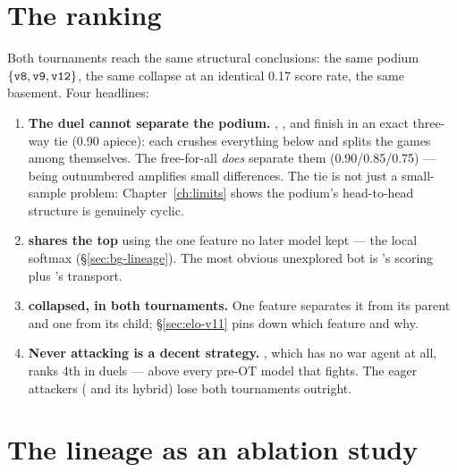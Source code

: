 \section{The ranking}
\label{sec:elo-ladder}

\begin{table}[htbp]
\centering
{}
\caption{The ladder under the duel protocol, with the free-for-all ranking
alongside (the two agree: Spearman $\rho = \ffaduelspearman$).}
\label{tab:elo}
\end{table}

Both tournaments reach the same structural conclusions: the same podium
$\{\texttt{v8}, \texttt{v9}, \texttt{v12}\}$, the same  collapse at an
identical 0.17 score rate, the same basement. Four headlines:

\begin{enumerate}
  \item \textbf{The duel cannot separate the podium.} , ,
    and  finish in an exact three-way tie (0.90 apiece): each
    crushes everything below and splits the games among themselves. The
    free-for-all \emph{does} separate them (0.90/0.85/0.75) --- being
    outnumbered amplifies small differences. The tie is not just a
    small-sample problem: Chapter~\ref{ch:limits} shows the podium's
    head-to-head structure is genuinely cyclic.
  \item \textbf{ shares the top} using the one feature no later
    model kept --- the local softmax (\S\ref{sec:bg-lineage}). The most
    obvious unexplored bot is 's scoring plus 's
    transport.
  \item \textbf{ collapsed, in both tournaments.} One feature
    separates it from its parent and one from its child; \S\ref{sec:elo-v11}
    pins down which feature and why.
  \item \textbf{Never attacking is a decent strategy.}
    , which has no war agent at all, ranks 4th in duels
    --- above every pre-OT model that fights. The eager attackers
    ( and its hybrid) lose both tournaments outright.
\end{enumerate}

\section{The lineage as an ablation study}
\label{sec:elo-ablation}

